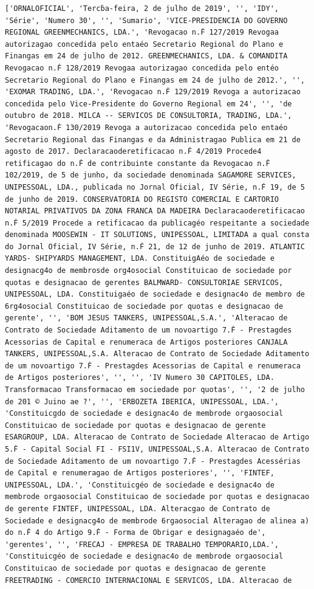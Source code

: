 \documentclass[
  12pt,
]{article}
\begin{document}
\begin{verbatim}
['ORNALOFICIAL', 'Tercḃa-feira, 2 de julho de 2019', '', 'IDY', 'Série', 'Numero 30', '', 'Sumario', 'VICE-PRESIDENCIA DO GOVERNO REGIONAL GREENMECHANICS, LDA.', 'Revogacao n.Ḟ 127/2019 Revogaa autorizagao concedida pelo entaéo Secretario Regional do Plano e Finangas em 24 de julho de 2012. GREENMECHANICS, LDA. & COMANDITA Revogacao n.Ḟ 128/2019 Revogaa autorizagao concedida pelo entéo Secretario Regional do Plano e Finangas em 24 de julho de 2012.', '', 'EXOMAR TRADING, LDA.', 'Revogacao n.Ḟ 129/2019 Revoga a autorizacao concedida pelo Vice-Presidente do Governo Regional em 24', '', 'de outubro de 2018. MILCA -- SERVICOS DE CONSULTORIA, TRADING, LDA.', 'Revogacaon.Ḟ 130/2019 Revoga a autorizacao concedida pelo entaéo Secretario Regional das Finangas e da Administragao Publica em 21 de agosto de 2017. Declaracaoderetificacao n.Ḟ 4/2019 Procede4 retificagao do n.Ḟ de contribuinte constante da Revogacao n.Ḟ 102/2019, de 5 de junho, da sociedade denominada SAGAMORE SERVICES, UNIPESSOAL, LDA., publicada no Jornal Oficial, IV Série, n.Ḟ 19, de 5 de junho de 2019. CONSERVATORIA DO REGISTO COMERCIAL E CARTORIO NOTARIAL PRIVATIVOS DA ZONA FRANCA DA MADEIRA Declaracaoderetificacao n.Ḟ 5/2019 Procede a retificacao da publicagéo respeitante a sociedade denominada MOOSEWIN - IT SOLUTIONS, UNIPESSOAL, LIMITADA a qual consta do Jornal Oficial, IV Série, n.Ḟ 21, de 12 de junho de 2019. ATLANTIC YARDS- SHIPYARDS MANAGEMENT, LDA. ConstituigAéo de sociedade e designacg4o de membrosde org4osocial Constituicao de sociedade por quotas e designacao de gerentes BALMWARD- CONSULTORIAE SERVICOS, UNIPESSOAL, LDA. Constituigaéo de sociedade e designac4o de membro de 6rg4osocial Constituicao de sociedade por quotas e designacao de gerente', '', 'BOM JESUS TANKERS, UNIPESSOAL,S.A.', 'Alteracao de Contrato de Sociedade Aditamento de um novoartigo 7.Ḟ - Prestagdes Acessorias de Capital e renumeraca de Artigos posteriores CANJALA TANKERS, UNIPESSOAL,S.A. Alteracao de Contrato de Sociedade Aditamento de um novoartigo 7.Ḟ - Prestagdes Acessorias de Capital e renumeraca de Artigos posteriores', '', '', 'IV Numero 30 CAPITOLES, LDA. Transformacao Transformacao em sociedade por quotas', '', '2 de julho de 201 © Juino ae ?', '', 'ERBOZETA IBERICA, UNIPESSOAL, LDA.', 'Constituicgdo de sociedade e designac4o de membrode orgaosocial Constituicao de sociedade por quotas e designacao de gerente ESARGROUP, LDA. Alteracao de Contrato de Sociedade Alteracao de Artigo 5.Ḟ - Capital Social FI - FSI1V, UNIPESSOAL,S.A. Alteracao de Contrato de Sociedade Aditamento de um novoartigo 7.Ḟ - Prestagdes Acessérias de Capital e renumeragao de Artigos posteriores', '', 'FINTEF, UNIPESSOAL, LDA.', 'Constituicgéo de sociedade e designac4o de membrode orgaosocial Constituicao de sociedade por quotas e designacao de gerente FINTEF, UNIPESSOAL, LDA. Alteracgao de Contrato de Sociedade e designacg4o de membrode 6rgaosocial Alteragao de alinea a) do n.Ḟ 4 do Artigo 9.Ḟ - Forma de Obrigar e designagaéo de', 'gerentes', '', 'FRECAJ - EMPRESA DE TRABALHO TEMPORARIO,LDA.', 'Constituicgéo de sociedade e designac4o de membrode orgaosocial Constituicao de sociedade por quotas e designacao de gerente FREETRADING - COMERCIO INTERNACIONAL E SERVICOS, LDA. Alteracao de 
\end{verbatim}
\end{document}

